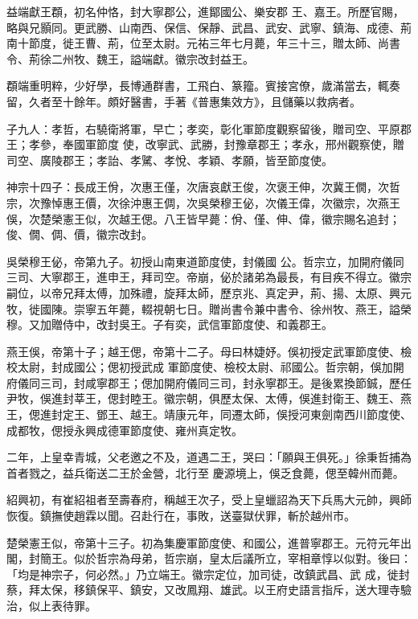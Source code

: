 \begin{pinyinscope}
 益端獻王頵，初名仲恪，封大寧郡公，進鄮國公、樂安郡
 王、嘉王。所歷官賜，略與兄顥同。更武勝、山南西、保信、保靜、武昌、武安、武寧、鎮海、成德、荊南十節度，徙王曹、荊，位至太尉。元祐三年七月薨，年三十三，贈太師、尚書令、荊徐二州牧、魏王，謚端獻。徽宗改封益王。



 頵端重明粹，少好學，長博通群書，工飛白、篆籀。賓接宮僚，歲滿當去，輒奏留，久者至十餘年。頗好醫書，手著《普惠集效方》，且儲藥以救病者。



 子九人：孝哲，右驍衛將軍，早亡；孝奕，彰化軍節度觀察留後，贈司空、平原郡王；孝參，奉國軍節度
 使，改寧武、武勝，封豫章郡王；孝永，邢州觀察使，贈司空、廣陵郡王；孝詒、孝騭、孝悅、孝穎、孝願，皆至節度使。



 神宗十四子：長成王佾，次惠王僅，次唐哀獻王俊，次褒王伸，次冀王僩，次哲宗，次豫悼惠王價，次徐沖惠王倜，次吳榮穆王佖，次儀王偉，次徽宗，次燕王俁，次楚榮憲王似，次越王偲。八王皆早薨：佾、僅、伸、偉，徽宗賜名追封；俊、僩、倜、價，徽宗改封。



 吳榮穆王佖，帝第九子。初授山南東道節度使，封儀國
 公。哲宗立，加開府儀同三司、大寧郡王，進申王，拜司空。帝崩，佖於諸弟為最長，有目疾不得立。徽宗嗣位，以帝兄拜太傅，加殊禮，旋拜太師，歷京兆、真定尹，荊、揚、太原、興元牧，徙國陳。崇寧五年薨，輟視朝七日。贈尚書令兼中書令、徐州牧、燕王，謚榮穆。又加贈侍中，改封吳王。子有奕，武信軍節度使、和義郡王。



 燕王俁，帝第十子；越王偲，帝第十二子。母曰林婕妤。俁初授定武軍節度使、檢校太尉，封成國公；偲初授武成
 軍節度使、檢校太尉、祁國公。哲宗朝，俁加開府儀同三司，封咸寧郡王；偲加開府儀同三司，封永寧郡王。是後累換節鋮，歷任尹牧，俁進封莘王，偲封睦王。徽宗朝，俱歷太保、太傅，俁進封衛王、魏王、燕王，偲進封定王、鄧王、越王。靖康元年，同遷太師，俁授河東劍南西川節度使、成都牧，偲授永興成德軍節度使、雍州真定牧。



 二年，上皇幸青城，父老邀之不及，道遇二王，哭曰：「願與王俱死。」徐秉哲捕為首者戮之，益兵衛送二王於金營，北行至
 慶源境上，俁乏食薨，偲至韓州而薨。



 紹興初，有崔紹祖者至壽春府，稱越王次子，受上皇蠟詔為天下兵馬大元帥，興師恢復。鎮撫使趙霖以聞。召赴行在，事敗，送臺獄伏罪，斬於越州市。



 楚榮憲王似，帝第十三子。初為集慶軍節度使、和國公，進普寧郡王。元符元年出閣，封簡王。似於哲宗為母弟，哲宗崩，皇太后議所立，宰相章惇以似對。後曰：「均是神宗子，何必然。」乃立端王。徽宗定位，加司徒，改鎮武昌、武
 成，徙封蔡，拜太保，移鎮保平、鎮安，又改鳳翔、雄武。以王府史語言指斥，送大理寺驗治，似上表待罪。




\end{pinyinscope}
